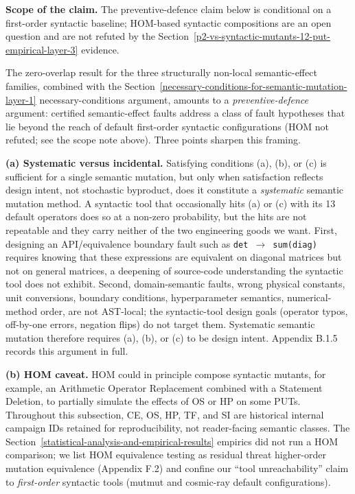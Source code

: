 \documentclass[manuscript,screen,review]{acmart}
\begin{document}
\textbf{Scope of the claim.} The preventive-defence claim below is
conditional on a first-order syntactic baseline; HOM-based syntactic
compositions are an open question and are not refuted by the Section~\ref{p2-vs-syntactic-mutants-12-put-empirical-layer-3}
evidence.

The zero-overlap result for the three structurally non-local
semantic-effect families, combined with the Section~\ref{necessary-conditions-for-semantic-mutation-layer-1}
necessary-conditions argument, amounts to a \emph{preventive-defence}
argument: certified semantic-effect faults address a class of fault
hypotheses that lie beyond the reach of default first-order syntactic
configurations (HOM not refuted; see the scope note above). Three points sharpen
this framing.

\textbf{(a) Systematic versus incidental.} Satisfying conditions (a),
(b), or (c) is sufficient for a single semantic mutation, but only when
satisfaction reflects design intent, not stochastic byproduct, does it
constitute a \emph{systematic} semantic mutation method. A syntactic
tool that occasionally hits (a) or (c) with its 13 default operators
does so at a non-zero probability, but the hits are not repeatable and
they carry neither of the two engineering goods we want. First,
designing an API/equivalence boundary fault such as \texttt{det\ $\to$\ sum(diag)} requires
knowing that these expressions are equivalent on diagonal matrices but
not on general matrices, a deepening of source-code understanding the
syntactic tool does not exhibit. Second, domain-semantic faults, wrong
physical constants, unit conversions, boundary conditions,
hyperparameter semantics, numerical-method order, are not AST-local; the
syntactic-tool design goals (operator typos, off-by-one errors, negation
flips) do not target them. Systematic semantic mutation therefore
requires (a), (b), or (c) to be design intent. Appendix B.1.5 records
this argument in full.

\textbf{(b) HOM caveat.} HOM \citep{c03829bdd1a6e45113092384bf0fa05a064ca54a,kintis2018effective}
could in principle compose syntactic mutants, for example, an Arithmetic
Operator Replacement combined with a Statement Deletion, to partially
simulate the effects of OS or HP on some PUTs. Throughout this subsection,
CE, OS, HP, TF, and SI are historical internal campaign IDs retained for
reproducibility, not reader-facing semantic classes. The Section~\ref{statistical-analysis-and-empirical-results} empirics did not
run a HOM comparison; we list HOM equivalence testing as residual threat
higher-order mutation equivalence (Appendix F.2) and confine our ``tool unreachability'' claim to
\emph{first-order} syntactic tools (mutmut and cosmic-ray default
configurations).
\end{document}
